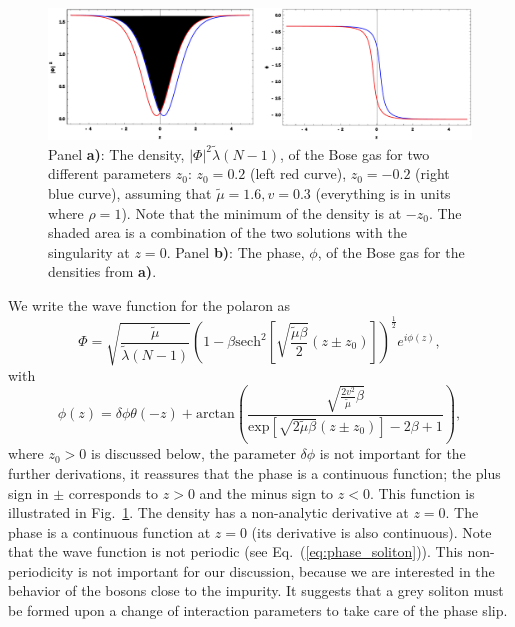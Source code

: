 \documentclass[twocolumn,amsmath,amssymb,showpacs,prl,superscriptaddress,aps]{revtex4-1}
\begin{document}
\begin{figure}
\centerline{\includegraphics[scale=0.45]{figure1appendix.pdf}}
\caption{Panel {\bf a)}: The density, $|\Phi|^2 \tilde \lambda (N-1)$, of the Bose gas for two different parameters $z_0$: $z_0=0.2$ (left red curve), $z_0=-0.2$ (right blue curve), 
assuming that $\tilde \mu=1.6, v=0.3$ (everything is in units where $\rho=1$). 
Note that the minimum of the density is at $-z_0$. The shaded area is a combination of the two solutions with the singularity at $z=0$. Panel {\bf b)}: The phase, $\phi$, of the Bose gas for the densities from {\bf a)}.}
\label{fig:Fig1}
\end{figure}

We write the wave function for the polaron as
\begin{equation}
\Phi=\sqrt{\frac{\tilde \mu}{\tilde \lambda (N-1)}}\left(1-\beta \mathrm{sech}^2\left[\sqrt{\frac{\tilde\mu\beta}{2}}(z\pm z_0)\right]\right)^{\frac{1}{2}}e^{i\phi(z)},
\end{equation}
with 
\begin{equation}
\phi(z)=\delta \phi \theta(-z)+\mathrm{arctan}\left(\frac{\sqrt{\frac{2 v^2}{\tilde \mu}\beta}}{\mathrm{exp}\left[\sqrt{2\tilde \mu\beta}(z\pm z_0)\right]-2\beta+1}\right),
\label{eq:phase_soliton}
\end{equation}
where $z_0>0$ is discussed below, the parameter $\delta \phi$ is not important for the further derivations, it reassures that the phase is a continuous function;
the plus sign in $\pm$ corresponds to $z>0$ and the minus sign to $z<0$. This function is illustrated in Fig.~\ref{fig:Fig1}. 
The density has a non-analytic derivative at $z=0$. The phase is a continuous function at $z=0$ (its derivative is also continuous).
Note that the wave function is not periodic (see Eq.~(\ref{eq:phase_soliton})). This non-periodicity is not important 
for our discussion, because we are interested in the behavior of the bosons close to the impurity. It suggests that a grey soliton
must be formed upon a change of interaction parameters to take care of the phase slip.
\end{document}
